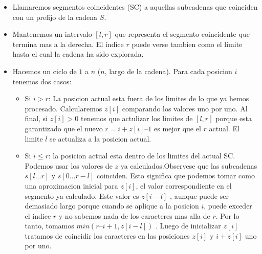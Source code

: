 \begin{itemize}
    \item{Llamaremos segmentos coincidentes (SC) a aquellas subcadenas que coinciden con un prefijo de la cadena $S$.}
    \item{Mantenemos un intervalo $[l, r]$ que representa el segmento coincidente que termina mas a la derecha. El \'indice $r$ puede verse tambien como el l\'imite hasta el cual la cadena ha sido explorada.}

    \item{Hacemos un ciclo de $1$ a $n$ ($n$, largo de la cadena). Para cada posicion $i$ tenemos dos casos:
    	\begin{itemize}
    		\item{Si $i>r$: La posicion actual esta fuera de los limites de lo que ya hemos procesado. Calcularemos $z[i]$ comparando los valores uno por uno. Al final, si $z [ i ] >0$ tenemos que actulizar los limites de $[ l ,r ]$ porque esta garantizado que el nuevo $r =i+ z [ i ] – 1$ es mejor que el $r$ actual. El limite $l$ se actualiza a la posicion actual.}
    		\item{Si $i \leq r$: la posicion actual esta dentro de los limites del actual SC. Podemos usar los valores de $z$ ya calculados.Observese que las subcadenas $s [ l... r ]$ y $s [ 0... r −l ]$ coinciden. Esto significa que podemos tomar como una aproximacion inicial para $z [ i ]$, el valor correspondiente en el segmento ya calculado. Este valor es $z [ i −l ]$ , aunque puede ser demasiado largo porque cuando se aplique a la posicion $i$, puede exceder el indice $r$ y no sabemos nada de los caracteres mas alla de $r$. Por lo tanto, tomamos $min ( r – i+1, z [ i− l ] )$ . Luego de inicializar $z [ i ]$ tratamos de coincidir los caracteres en las posiciones $z [ i ]$ y $i+ z [ i ]$ uno por uno.}
    	\end{itemize}	
    }
\end{itemize}

